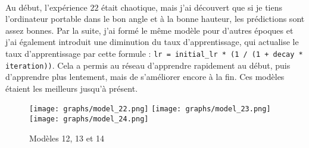 \paragraph{}
Au début, l'expérience $22$ était chaotique, mais j'ai découvert que si je tiens l'ordinateur portable dans le bon angle et à la bonne hauteur, les prédictions sont assez bonnes.
Par la suite, j'ai formé le même modèle pour d'autres époques et j'ai également introduit une diminution du taux d'apprentissage, qui actualise le taux d'apprentissage par cette formule :
\lstinline{lr = initial_lr * (1 / (1 + decay * iteration))}.
Cela a permis au réseau d'apprendre rapidement au début, puis d'apprendre plus lentement, mais de s'améliorer encore à la fin.
Ces modèles étaient les meilleurs jusqu'à présent.

\begin{figure}[H]
    \centering
    \texttt{[image: graphs/model\_22.png]}
    \texttt{[image: graphs/model\_23.png]}
    \texttt{[image: graphs/model\_24.png]}
    \caption{Modèles 12, 13 et 14}
\end{figure}